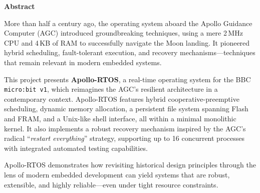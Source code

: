 \begin{center}
    \Large \bfseries Abstract
\end{center}

More than half a century ago, the operating system aboard the Apollo Guidance Computer
(AGC) introduced groundbreaking techniques, using a mere 2 MHz CPU and 4 KB of RAM to
successfully navigate the Moon landing. It pioneered hybrid scheduling, fault-tolerant
execution, and recovery mechanisms---techniques that remain relevant in modern embedded
systems.

This project presents \textbf{Apollo-RTOS}, a real-time operating system for the BBC
\texttt{micro:bit v1}, which reimagines the AGC’s resilient architecture in a
contemporary context. Apollo-RTOS features hybrid cooperative-preemptive scheduling,
dynamic memory allocation, a persistent file system spanning Flash and FRAM, and a
Unix-like shell interface, all within a minimal monolithic kernel. It also implements a
robust recovery mechanism inspired by the AGC’s radical ``\textit{restart everything}''
strategy, supporting up to 16 concurrent processes with integrated automated testing
capabilities.

Apollo-RTOS demonstrates how revisiting historical design principles through the lens
of modern embedded development can yield systems that are robust, extensible, and
highly reliable---even under tight resource constraints.

